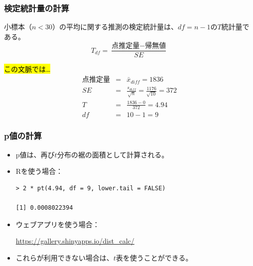 \begin{frame}
\frametitle{検定統計量の計算}

{小標本（$n < 30$）の平均に関する推測の検定統計量は、$df = n - 1$の$T$統計量である。
\[ T_{df} = \frac{\text{点推定量} - \text{帰無値}}{SE} \]}

\vspace{-0.5cm}

\hl{この文脈では…}
\begin{eqnarray*}
\text{点推定量} &=& \bar{x}_{diff} = 1836 \\
SE &=& \frac{s_{diff}}{\sqrt{n}} = \frac{1176}{\sqrt{10}} = 372 \\
T &=& \frac{1836 - 0}{372} = 4.94 \\
df &=& 10 - 1 = 9
\end{eqnarray*}

\vspace{-0.25cm}


\end{frame}


\begin{frame}[fragile]
\frametitle{p値の計算}

\begin{itemize}

\item p値は、再び$t$分布の裾の面積として計算される。

\item Rを使う場合：
\begin{verbatim}
> 2 * pt(4.94, df = 9, lower.tail = FALSE)

[1] 0.0008022394
\end{verbatim}

\item ウェブアプリを使う場合：

\href{https://gallery.shinyapps.io/dist_calc/}{\textcolor{oiB}{https://gallery.shinyapps.io/dist\_calc/}}

\item これらが利用できない場合は、$t$表を使うことができる。

\end{itemize}

\end{frame}



